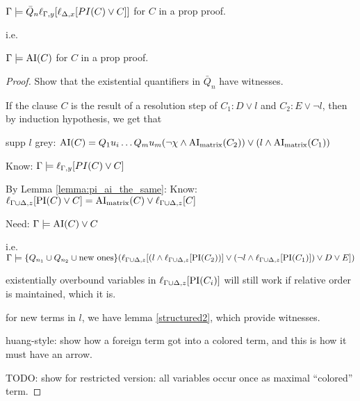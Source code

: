 \documentclass[,%
	paper=a4,%
	DIV14, 
	liststotoc,
	bibtotoc,
	draft=false,%
	numbers=noendperiod
]{scrartcl}
\begin{document}
\begin{lemma}
	$\Gamma \models \bar Q_n  \ell_{\Gamma,y}[ \ell_{\Delta,x}[PI(C)\lor C] ] $ for $C$ in a prop proof.

	i.e.

	$\Gamma \models \operatorname{AI}(C) $ for $C$ in a prop proof.
\end{lemma}
\begin{proof}
	Show that the existential quantifiers in $\bar Q_n$ have witnesses.

	If the clause $C$ is the result of a resolution step of $C_1: D \lor l$ and $C_2: E \lor \lnot l$, then by induction hypothesis, we get that

	supp $l$ grey:
	$\operatorname{AI}(C) = Q_1 u_i\dots Q_m u_m (\lnot \chi \land \operatorname{AI}_\mathrm{matrix}(C_2)) \lor (l \land \operatorname{AI}_\mathrm{matrix}(C_1)) $

	Know:   $\Gamma \models  \ell_{\Gamma,y}[{PI(C)\lor C} ]$

	By Lemma \ref{lemma:pi_ai_the_same}:
	Know:   $  \ell_{\Gamma\cup\Delta,z}[{{\operatorname{PI}(C)\lor C} }] = \operatorname{AI}_\mathrm{matrix}(C) \lor \ell_{\Gamma\cup\Delta,z}[C]$


	Need:
	$\Gamma \models \operatorname{AI}(C) \lor C$ 

	i.e.
	$\Gamma \models \{Q_{n_1} \cup Q_{n_2} \cup \text{new ones}\} ( \ell_{\Gamma\cup\Delta,z}[(l \land \ell_{\Gamma\cup\Delta,z}[ \operatorname{PI}(C_2)) ] \lor (\lnot l \land \ell_{\Gamma\cup\Delta,z}[\operatorname{PI}(C_1)]) \lor D \lor E ])$



	existentially overbound variables in $\ell_{\Gamma\cup\Delta,z}[\operatorname{PI}(C_i)]$ will still work if relative order is maintained, which it is.

	for new terms in $l$, we have lemma \ref{structured2}, which provide witnesses.

	huang-style: show how a foreign term got into a colored term, and this is how it must have an arrow.


	TODO: show for restricted version: all variables occur once as maximal ``colored'' term. 




\end{proof}


\clearpage
\end{document}
